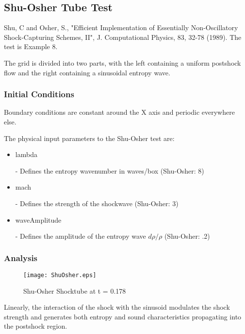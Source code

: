 

\subsection{Shu-Osher Tube Test}

Shu, C and Osher, S., "Efficient Implementation of Essentially Non-Oscillatory Shock-Capturing 
Schemes, II", J. Computational Physics, 83, 32-78 (1989). The test is Example 8. 

The grid is divided into two parts, with the left containing a uniform postshock flow and the right containing a sinusoidal 
entropy wave.

\subsubsection{Initial Conditions}

Boundary conditions are constant around the X axis and periodic everywhere else.

The physical input parameters to the Shu-Osher test are:
\begin{itemize}
\item \begin{tt}lambda\end{tt} - Defines the entropy wavenumber in waves/box (Shu-Osher: 8)
\item \begin{tt}mach\end{tt} - Defines the strength of the shockwave (Shu-Osher: 3)
\item \begin{tt}waveAmplitude\end{tt} - Defines the amplitude of the entropy wave $d\rho/\rho$ (Shu-Osher: .2)
\end{itemize}

\subsubsection{Analysis}

\begin{figure*}
\begin{center}
\texttt{[image: ShuOsher.eps]}
\caption{Shu-Osher Shocktube at t = 0.178}
\end{center}
\end{figure*}

Linearly, the interaction of the shock with the sinusoid modulates the shock strength and generates both entropy and sound
characteristics propagating into the postshock region.

